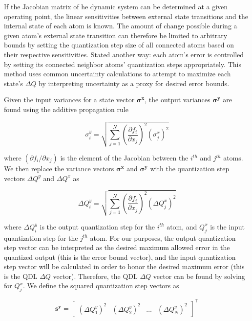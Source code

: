 If the Jacobian matrix of he dynamic system can be determined at a given operating point, the linear sensitivities between external state transitions and the internal state of each atom is known. The amount of change possible during a given atom's external state transition can therefore be limited to arbitrary bounds by setting the quantization step size of all connected atoms based on their respective sensitivities. Stated another way: each atom's error is controlled by setting its connected neighbor atoms' quantization steps appropriately. This method uses common uncertainty calculations to attempt to maximize each state's $\Delta Q$ by interpreting uncertainty as a proxy for desired error bounds. 

Given the input variances for a state vector $\mathbf{\sigma^x}$, the output variances $\mathbf{\sigma^y}$ are found using the additive propagation rule

\begin{equation} \label{eq:err_prop}
\sigma_i^y = \sqrt{  \sum_{j=1}^{N}{ \left( \frac{\partial f_i}{\partial x_j} \right) ^2 ( \sigma_j^x)^2 } }
\end{equation}

where $( \partial f_i / \partial x_j )$ is the element of the Jacobian between the $i^{th}$ and $j^{th}$ atoms. We then replace the variance vectors $\mathbf{\sigma^x}$ and $\mathbf{\sigma^y}$ with the quantization step vectors $\Delta Q^y$ and $\Delta Q^x$ as

\begin{equation} \label{eq:err_prop2}
\Delta Q_i^y = \sqrt{  \sum_{j=1}^{N}{ \left( \frac{\partial f_i}{\partial x_j} \right) ^2 (\Delta Q_j^x)^2 } }
\end{equation}

where $\Delta Q_i^y$ is the output quantization step for the $i^{th}$ atom, and $Q_j^x$ is the input quantization step for the $j^{th}$ atom. For our purposes, the output quantization step vector can be interpreted as the desired maximum allowed error in the quantized output (this is the error bound vector), and the input quantization step vector will be calculated in order to honor the desired maximum error (this is the QDL $\Delta Q$ vector). Therefore, the QDL $\Delta Q$ vector can be found by solving for $Q_j^x$. We define the squared quantization step vectors as

\begin{equation} \label{eq:covar_sy}
\mathbf{s^y} = 
\begin{bmatrix}
\left( \Delta Q_1^y \right)^2 &
\left( \Delta Q_2^y \right)^2 & \dots &
\left( \Delta Q_N^y \right)^2
\end{bmatrix}^\top
\end{equation}

